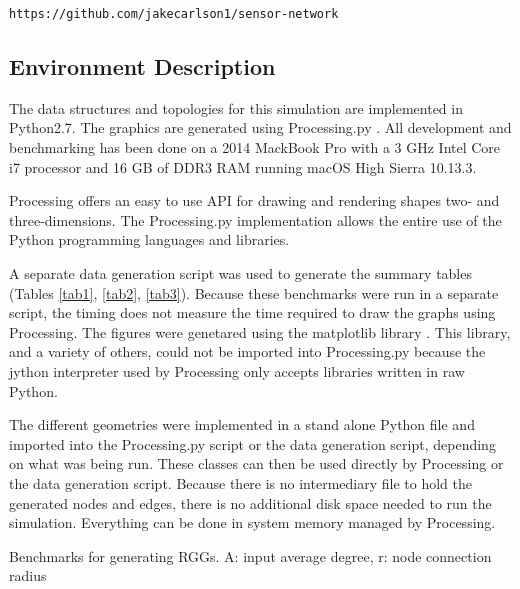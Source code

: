 \documentclass{article}
\begin{document}
    \begin{center}
        \texttt{https://github.com/jakecarlson1/sensor-network}
    \end{center}

    \subsection{Environment Description}
    The data structures and topologies for this simulation are implemented in Python2.7. The graphics are generated using Processing.py \cite{processing}. All development and benchmarking has been done on a 2014 MackBook Pro with a 3 GHz Intel Core i7 processor and 16 GB of DDR3 RAM running macOS High Sierra 10.13.3.
    \par
    Processing offers an easy to use API for drawing and rendering shapes two- and three-dimensions. The Processing.py implementation allows the entire use of the Python programming languages and libraries.
    \par
    A separate data generation script was used to generate the summary tables (Tables \ref{tab1}, \ref{tab2}, \ref{tab3}). Because these benchmarks were run in a separate script, the timing does not measure the time required to draw the graphs using Processing. The figures were genetared using the matplotlib library \cite{matplotlib}. This library, and a variety of others, could not be imported into Processing.py because the jython interpreter used by Processing only accepts libraries written in raw Python.
    \par
    The different geometries were implemented in a stand alone Python file and imported into the Processing.py script or the data generation script, depending on what was being run. These classes can then be used directly by Processing or the data generation script. Because there is no intermediary file to hold the generated nodes and edges, there is no additional disk space needed to run the simulation. Everything can be done in system memory managed by Processing.

    \begin{center}
        \begin{table}[h]
            \centering
            \caption{Benchmarks for generating RGGs. A: input average degree, r: node connection radius}
            \label{tab1}
        \end{table}
    \end{center}
\end{document}
